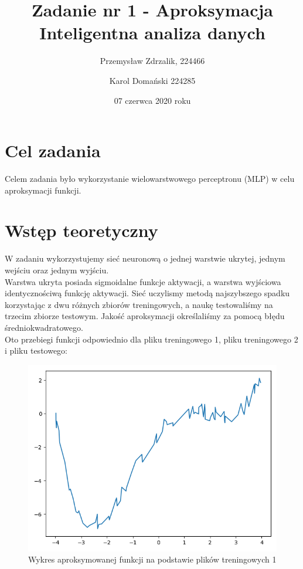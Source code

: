 \documentclass[12pt]{article}
\title{{\bf Zadanie nr 1 - Aproksymacja}\linebreak
Inteligentna analiza danych}
\author{Przemysław Zdrzalik, 224466 \and Karol Domański 224285}
\date{07 czerwca 2020 roku}
\begin{document}
\clearpage\maketitle
\thispagestyle{empty}
\newpage
\setcounter{page}{1}
\section{Cel zadania}

Celem zadania było wykorzystanie wielowarstwowego perceptronu (MLP) w celu aproksymacji funkcji.

\section{Wstęp teoretyczny}

W zadaniu wykorzystujemy sieć neuronową o jednej warstwie ukrytej, jednym wejściu oraz jednym wyjściu. \\ Warstwa ukryta posiada sigmoidalne funkcje aktywacji, a warstwa wyjściowa identycznościwą funkcję aktywacji. Sieć uczylismy metodą najszybszego spadku  korzystając z dwu różnych zbiorów treningowych, a naukę testowaliśmy na trzecim zbiorze testowym.
Jakość aproksymacji określaliśmy za pomocą błędu średniokwadratowego.\\

Oto przebiegi funkcji odpowiednio dla pliku treningowego 1, pliku treningowego 2 i pliku testowego:

\begin{figure}[!htb]
 \centering
 \includegraphics[width=12cm]{originalfunc1.png}
 \caption{Wykres aproksymowanej funkcji na podstawie plików treningowych 1}
 \vspace{-0.3cm}
 \label{originalfunc1}
\end{figure}
\end{document}
